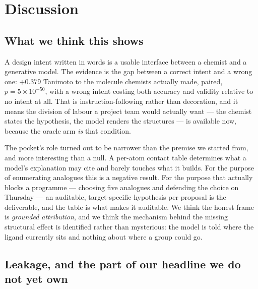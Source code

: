 \section{Discussion}

\subsection{What we think this shows}

A design intent written in words is a usable interface between a chemist and a generative model. The
evidence is the gap between a correct intent and a wrong one: $+0.379$ Tanimoto to the molecule
chemists actually made, paired, $p=5\times10^{-50}$, with a wrong intent costing both accuracy and
validity relative to no intent at all. That is instruction-following rather than decoration, and it
means the division of labour a project team would actually want --- the chemist states the
hypothesis, the model renders the structures --- is available now, because the oracle arm \emph{is}
that condition.

The pocket's role turned out to be narrower than the premise we started from, and more interesting
than a null. A per-atom contact table determines what a model's explanation may cite and barely
touches what it builds. For the purpose of enumerating analogues this is a negative result. For the
purpose that actually blocks a programme --- choosing five analogues and defending the choice on
Thursday --- an auditable, target-specific hypothesis per proposal is the deliverable, and the table
is what makes it auditable. We think the honest frame is \emph{grounded attribution}, and we think
the mechanism behind the missing structural effect is identified rather than mysterious: the model is
told where the ligand currently sits and nothing about where a group could go.

\subsection{Leakage, and the part of our headline we do not yet own}
\label{sec:leakage}

